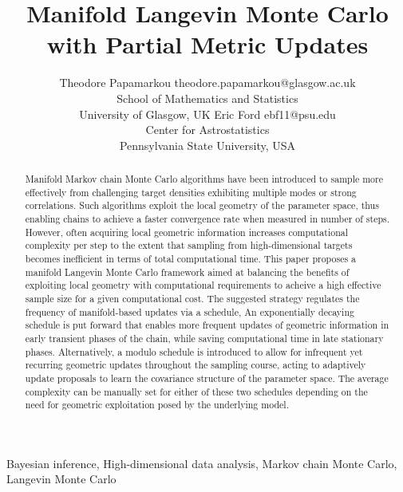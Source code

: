 \documentclass[twoside,11pt]{article}
\begin{document}
\title{Manifold Langevin Monte Carlo with Partial Metric Updates}

\author{\name Theodore Papamarkou
	     \email theodore.papamarkou@glasgow.ac.uk\\
       \addr School of Mathematics and Statistics\\
       University of Glasgow, UK
       \AND
       \name Eric Ford
       \email ebf11@psu.edu\\
       \addr Center for Astrostatistics\\
       Pennsylvania State University, USA
}


\maketitle

\begin{abstract}%
Manifold Markov chain Monte Carlo algorithms have been introduced to sample more effectively from challenging target 
densities exhibiting multiple modes or strong correlations. Such algorithms exploit the local geometry of the parameter 
space, thus enabling chains to achieve a faster convergence rate when measured in number of steps. However, often acquiring local geometric information increases 
computational complexity per step to the extent that sampling from high-dimensional targets becomes inefficient in terms of total computational time.
This paper proposes a manifold Langevin Monte Carlo framework aimed at balancing the benefits of exploiting local geometry with computational requirements to acheive a high effective sample size for a given computational cost.
The suggested strategy regulates the frequency of manifold-based updates via a schedule,  An 
exponentially decaying schedule is put forward that enables more frequent updates of geometric information in early 
transient phases of the chain, while saving computational time in late stationary phases. Alternatively, a modulo schedule 
is introduced to allow for infrequent yet recurring geometric updates throughout the sampling course, acting to adaptively update proposals to learn the covariance structure of the parameter space. The average complexity can be 
manually set for either of these two schedules depending on the need for geometric exploitation posed by the underlying 
model.  
\end{abstract}

\begin{keywords}
  Bayesian inference,
  High-dimensional data analysis,
  Markov chain Monte Carlo,
  Langevin Monte Carlo	
\end{keywords}
\end{document}
